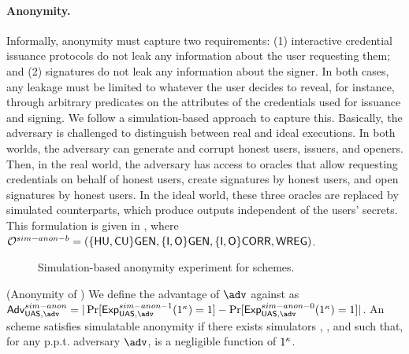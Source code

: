 \paragraph{Anonymity.} %
Informally, anonymity must capture two requirements: (1) interactive credential
issuance protocols do not leak any information about the user requesting them;
and (2) signatures do not leak any information about the signer. In both cases,
any leakage must be limited to whatever the user decides to reveal, for
instance, through arbitrary predicates on the attributes of the credentials used
for issuance and signing. We follow a simulation-based approach to capture this.
Basically, the adversary is challenged to distinguish between real and ideal
executions. In both worlds, the adversary can generate and corrupt honest users,
issuers, and openers. Then, in the real world, the adversary has access to
oracles that allow requesting credentials on behalf of honest users, create
signatures by honest users, and open signatures by honest users. In the ideal
world, these three oracles are replaced by simulated counterparts, which produce
outputs independent of the users' secrets. This formulation is given in
, where $\mathcal{O}^{sim-anon-b} = (\lbrace\mathsf{HU},\mathsf{CU}\rbrace\mathsf{GEN},
\lbrace\mathsf{I},\mathsf{O}\rbrace\mathsf{GEN},\lbrace\mathsf{I},\mathsf{O}\rbrace\mathsf{CORR},\mathsf{WREG})$.

\begin{figure}[htp!]

  \centering
  
  \caption{Simulation-based anonymity experiment for \UAS schemes.}
  \label{fig:exp-uas-anonb}
\end{figure}

\begin{definition}{(Anonymity of \UAS)}
  \label{def:anonymity-uas}  
  We define the advantage \AdvSimAnon of $\adv$ against \ExpSimAnonb as
  $\AdvSimAnon=|\Pr\lbrack\ExpSimAnono(1^\secpar)=1\rbrack-
  \Pr\lbrack\ExpSimAnonz(1^\secpar)=1\rbrack|$.
  An \UAS scheme satisfies simulatable anonymity if there exists simulators
  \SIMSETUP, \SIMOBTAIN, \SIMSIGN and \SIMOPEN such that, for any p.p.t.
  adversary $\adv$, \AdvSimAnon is a negligible function of $1^\kappa$.
\end{definition}

